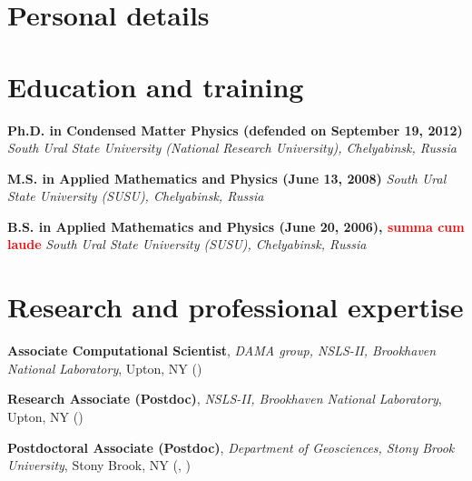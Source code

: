 \def\titlename{Bio}




\maketitle

\footnotesize

\vspace{-60pt}

\section{Personal details}



\section{Education and training}

{\textbf{Ph.D. in Condensed Matter Physics (defended on September 19, 2012)}
\newline \textit{South Ural State University (National Research University),
Chelyabinsk, Russia}}

{\textbf{M.S. in Applied Mathematics and Physics (June 13, 2008)} \newline
\textit{South Ural State University (SUSU), Chelyabinsk, Russia}}

{\textbf{B.S. in Applied Mathematics and Physics (June 20, 2006),
\textcolor{red}{summa cum laude}} \newline
\textit{South Ural State University (SUSU), Chelyabinsk, Russia}}


\section{Research and professional expertise}

 {\textbf{Associate Computational Scientist}, \textit{DAMA group, NSLS-II,
Brookhaven National Laboratory}, Upton, NY ()}

 {\textbf{Research Associate (Postdoc)},
\textit{NSLS-II, Brookhaven National Laboratory}, Upton, NY
()}

{\textbf{Postdoctoral Associate (Postdoc)}, \textit{Department of Geosciences,
Stony Brook University}, Stony Brook, NY (,
)}

